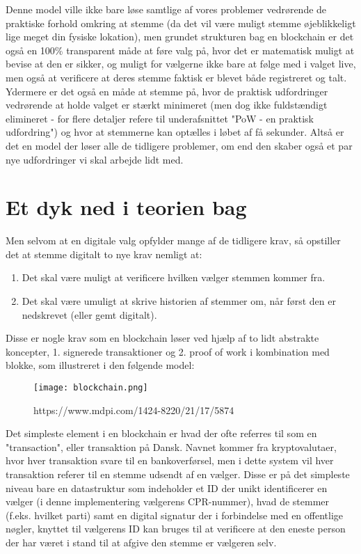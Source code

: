 \documentclass[a4paper, 8pt, oneside]{article} %
\begin{document}
Denne model ville ikke bare løse samtlige af vores problemer vedrørende de praktiske forhold omkring at stemme (da det vil være muligt stemme øjeblikkeligt lige meget din fysiske lokation), men grundet strukturen bag en blockchain er det også en 100\% transparent måde at føre valg på, hvor det er matematisk muligt at bevise at den er sikker, og muligt for vælgerne ikke bare at følge med i valget live, men også at verificere at deres stemme faktisk er blevet både registreret og talt. Ydermere er det også en måde at stemme på, hvor de praktisk udfordringer vedrørende at holde valget er stærkt minimeret (men dog ikke fuldstændigt elimineret - for flere detaljer refere til underafsnittet "PoW - en praktisk udfordring") og hvor at stemmerne kan optælles i løbet af få sekunder. Altså er det en model der løser alle de tidligere problemer, om end den skaber også et par nye udfordringer vi skal arbejde lidt med.

\newpage

\section{Et dyk ned i teorien bag}
Men selvom at en digitale valg opfylder mange af de tidligere krav, så opstiller det at stemme digitalt to nye krav nemligt at:

\begin{enumerate}
	\item Det skal være muligt at verificere hvilken vælger stemmen kommer fra.
	\item Det skal være umuligt at skrive historien af stemmer om, når først den er nedskrevet (eller gemt digitalt).
\end{enumerate}

Disse er nogle krav som en blockchain løser ved hjælp af to lidt abstrakte koncepter, 1. signerede transaktioner og 2. proof of work i kombination med blokke, som illustreret i den følgende model:\\

\begin{figure} [ht]
  \centering
  \texttt{[image: blockchain.png]}
	\caption{https://www.mdpi.com/1424-8220/21/17/5874}
  \label{fig:blockchain}
\end{figure}


Det simpleste element i en blockchain er hvad der ofte referres til som en "transaction", eller transaktion på Dansk. Navnet kommer fra kryptovalutaer, hvor hver transaktion svare til en bankoverførsel, men i dette system vil hver transaktion referer til en stemme udsendt af en vælger. Disse er på det simpleste niveau bare en datastruktur som indeholder et ID der unikt identificerer en vælger (i denne implementering vælgerens CPR-nummer), hvad de stemmer (f.eks. hvilket parti) samt en digital signatur der i forbindelse med en offentlige nøgler, knyttet til vælgerens ID kan bruges til at verificere at den eneste person der har været i stand til at afgive den stemme er vælgeren selv.
\end{document}
